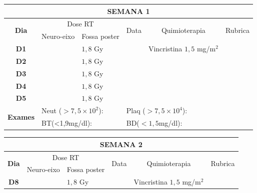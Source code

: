 \documentclass[11pt,a4paper,oldfontcommands]{memoir}
\begin{document}
\begin{center}
\begin{tabular}{p{1cm}p{2cm}|p{2cm}|p{1cm}|p{4cm}|p{3cm}}
	\hline
	\multicolumn{6}{c}{\textbf{SEMANA 1}}\\
\hline
    \multicolumn{1}{c|}{\multirow{2}{*}{\textbf{Dia}}}&\multicolumn{2}{c|}{Dose RT}&\multicolumn{1}{c|}{\multirow{2}{*}{Data}}&\multicolumn{1}{c|}{\multirow{2}{*}{Quimioterapia}}&\multicolumn{1}{c}{\multirow{2}{*}{Rubrica}} \\
    \cline{2-3}
    \multicolumn{1}{c|}{\multirow{1}{*}{}}&{Neuro-eixo}&{Fossa poster}&& \\
	\hline
	\multicolumn{1}{c|}{\multirow{1}{*}{\textbf{D1}}}&\multicolumn{1}{c|}{}&{\(1,8\) Gy}&&{Vincristina \(1,5\) mg/m\(^2\)}&\\
    \multicolumn{1}{c|}{\multirow{1}{*}{\textbf{D2}}}&\multicolumn{1}{c|}{}&{\(1,8\) Gy}&&{}&\\
    \multicolumn{1}{c|}{\multirow{1}{*}{\textbf{D3}}}&\multicolumn{1}{c|}{}&{\(1,8\) Gy}&&{}&\\
    \multicolumn{1}{c|}{\multirow{1}{*}{\textbf{D4}}}&\multicolumn{1}{c|}{}&{\(1,8\) Gy}&&{}&\\
    \multicolumn{1}{c|}{\multirow{1}{*}{\textbf{D5}}}&\multicolumn{1}{c|}{}&{\(1,8\) Gy}&&{}&\\
    \hline
    \multicolumn{1}{c|}{\multirow{2}{*}{\textbf{Exames}}}&\multicolumn{2}{l|}{Neut (\(>7,5\times10^2\)):}&\multicolumn{2}{l|}{Plaq (\(>7,5\times10^4\)):}&\\
    \cline{2-6}
    \multicolumn{1}{c|}{\multirow{2}{*}{{}}}&\multicolumn{2}{l|}{BT(<1,9mg/dl):}&\multicolumn{2}{l|}{BD(\(<1,5\)mg/dl):}&
    \\
    \hline
\end{tabular}
\begin{table}[H]
\begin{tabular}{p{1cm}p{2cm}|p{2cm}|p{1cm}|p{4cm}|p{3cm}}
	\hline
	\multicolumn{6}{c}{\textbf{SEMANA 2}}\\
\hline
    \multicolumn{1}{c|}{\multirow{2}{*}{\textbf{Dia}}}&\multicolumn{2}{c|}{Dose RT}&\multicolumn{1}{c|}{\multirow{2}{*}{Data}}&\multicolumn{1}{c|}{\multirow{2}{*}{Quimioterapia}}&\multicolumn{1}{c}{\multirow{2}{*}{Rubrica}} \\
    \cline{2-3}
    \multicolumn{1}{c|}{\multirow{1}{*}{}}&{Neuro-eixo}&{Fossa poster}&& \\
	\hline
	\multicolumn{1}{c|}{\multirow{1}{*}{\textbf{D8}}}&\multicolumn{1}{c|}{}&{\(1,8\) Gy}&&{Vincristina \(1,5\) mg/m\(^2\)}&\\

\end{tabular}
\end{table}
\end{center}
\end{document}
